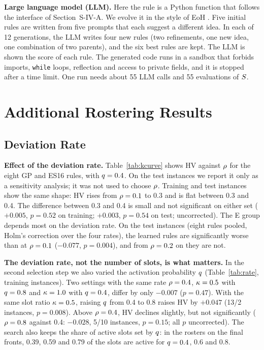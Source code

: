 \documentclass[journal]{IEEEtran}
\begin{document}
\textbf{Large language model (LLM).}
Here the rule is a Python function that follows the interface of Section~S-IV-A.
We evolve it in the style of EoH \cite{liu2024evolution}.
Five initial rules are written from five prompts that each suggest a different idea.
In each of 12 generations, the LLM writes four new rules (two refinements, one new idea, one combination of two parents), and the six best rules are kept.
The LLM is shown the score of each rule.
The generated code runs in a sandbox that forbids imports, \texttt{while} loops, reflection and access to private fields, and it is stopped after a time limit.
One run needs about 55 LLM calls and 55 evaluations of $S$.



\section{Additional Rostering Results}
\label{sec:s-roster}

\subsection{Deviation Rate}
\textbf{Effect of the deviation rate.}
Table~\ref{tab:kcurve} shows HV against $\rho$ for the eight GP and ES16 rules, with $q = 0.4$.
On the test instances we report it only as a sensitivity analysis; it was not used to choose $\rho$.
Training and test instances show the same shape: HV rises from $\rho = 0.1$ to 0.3 and is flat between 0.3 and 0.4.
The difference between 0.3 and 0.4 is small and not significant on either set ($+0.005$, $p = 0.52$ on training; $+0.003$, $p = 0.54$ on test; uncorrected).
The E group depends most on the deviation rate.
On the test instances (eight rules pooled, Holm's correction over the four rates), the learned rules are significantly worse than  at $\rho = 0.1$ ($-0.077$, $p = 0.004$), and from $\rho = 0.2$ on they are not.

\textbf{The deviation rate, not the number of slots, is what matters.}
In the second selection step we also varied the activation probability $q$ (Table~\ref{tab:rate}, training instances).
Two settings with the same rate $\rho = 0.4$, $\kappa = 0.5$ with $q = 0.8$ and $\kappa = 1.0$ with $q = 0.4$, differ by only $-0.007$ ($p = 0.47$).
With the same slot ratio $\kappa = 0.5$, raising $q$ from 0.4 to 0.8 raises HV by $+0.047$ (13/2 instances, $p = 0.008$).
Above $\rho = 0.4$, HV declines slightly, but not significantly ($\rho = 0.8$ against 0.4: $-0.028$, 5/10 instances, $p = 0.15$; all $p$ uncorrected).
The search also keeps the share of active slots set by $q$:
in the rosters on the final fronts, 0.39, 0.59 and 0.79 of the slots are active for $q = 0.4$, 0.6 and 0.8.
\end{document}
